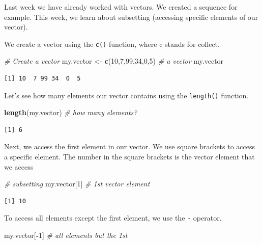 \documentclass[]{book}
\newenvironment{Shaded}{\begin{snugshade}}{\end{snugshade}}
\newcommand{\KeywordTok}[1]{\textcolor[rgb]{0.13,0.29,0.53}{\textbf{#1}}}
\newcommand{\DecValTok}[1]{\textcolor[rgb]{0.00,0.00,0.81}{#1}}
\newcommand{\StringTok}[1]{\textcolor[rgb]{0.31,0.60,0.02}{#1}}
\newcommand{\CommentTok}[1]{\textcolor[rgb]{0.56,0.35,0.01}{\textit{#1}}}
\newcommand{\OperatorTok}[1]{\textcolor[rgb]{0.81,0.36,0.00}{\textbf{#1}}}
\newcommand{\NormalTok}[1]{#1}
\theoremstyle{definition}
\theoremstyle{definition}
\theoremstyle{definition}
\theoremstyle{remark}
\begin{document}
Last week we have already worked with vectors. We created a sequence for
example. This week, we learn about subsetting (accessing specific
elements of our vector).

We create a vector using the \texttt{c()} function, where c stands for
collect.

\begin{Shaded}
\begin{Highlighting}[]
\CommentTok{# Create a vector}
\NormalTok{my.vector <-}\StringTok{ }\KeywordTok{c}\NormalTok{(}\DecValTok{10}\NormalTok{,}\DecValTok{7}\NormalTok{,}\DecValTok{99}\NormalTok{,}\DecValTok{34}\NormalTok{,}\DecValTok{0}\NormalTok{,}\DecValTok{5}\NormalTok{) }\CommentTok{# a vector}
\NormalTok{my.vector}
\end{Highlighting}
\end{Shaded}

\begin{verbatim}
[1] 10  7 99 34  0  5
\end{verbatim}

Let's see how many elements our vector contains using the
\texttt{length()} function.

\begin{Shaded}
\begin{Highlighting}[]
\KeywordTok{length}\NormalTok{(my.vector) }\CommentTok{# how many elements?}
\end{Highlighting}
\end{Shaded}

\begin{verbatim}
[1] 6
\end{verbatim}

Next, we access the first element in our vector. We use square brackets
to access a specific element. The number in the square brackets is the
vector element that we access

\begin{Shaded}
\begin{Highlighting}[]
\CommentTok{# subsetting}
\NormalTok{my.vector[}\DecValTok{1}\NormalTok{] }\CommentTok{# 1st vector element}
\end{Highlighting}
\end{Shaded}

\begin{verbatim}
[1] 10
\end{verbatim}

To access all elements except the first element, we use the \texttt{-}
operator.

\begin{Shaded}
\begin{Highlighting}[]
\NormalTok{my.vector[}\OperatorTok{-}\DecValTok{1}\NormalTok{] }\CommentTok{# all elements but the 1st}
\end{Highlighting}
\end{Shaded}
\end{document}
